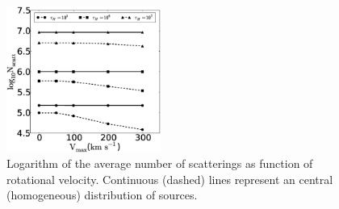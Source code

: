 \documentclass{emulateapj}
\begin{document}
\begin{figure}
    \includegraphics[width=0.45\textwidth]{f4.eps}
\caption{Logarithm of the average number of scatterings as function of
  rotational velocity. Continuous (dashed) lines represent an
  central (homogeneous) distribution of sources. \label{fig:Nscatt}}    
\end{figure}
\end{document}
